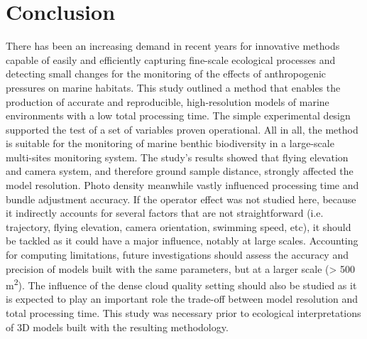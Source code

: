 \section[Conclusion]{Conclusion}\label{chapitre1_5}
There has been an increasing demand in recent years for innovative methods capable of easily and efficiently capturing fine-scale ecological processes and detecting small changes for the monitoring of the effects of anthropogenic pressures on marine habitats. This study outlined a method that enables the production of accurate and reproducible, high-resolution models of marine environments with a low total processing time. The simple experimental design supported the test of a set of variables proven operational. All in all, the method is suitable for the monitoring of marine benthic biodiversity in a large-scale multi-sites monitoring system. The study’s results showed that flying elevation and camera system, and therefore ground sample distance, strongly affected the model resolution. Photo density meanwhile vastly influenced processing time and bundle adjustment accuracy. If the operator effect was not studied here, because it indirectly accounts for several factors that are not straightforward (i.e. trajectory, flying elevation, camera orientation, swimming speed, etc), it should be tackled as it could have a major influence, notably at large scales. Accounting for computing limitations, future investigations should assess the accuracy and precision of models built with the same parameters, but at a larger scale (> 500 m\textsuperscript{2}). The influence of the dense cloud quality setting should also be studied as it is expected to play an important role the trade-off between model resolution and total processing time. This study was necessary prior to ecological interpretations of 3D models built with the resulting methodology. 

